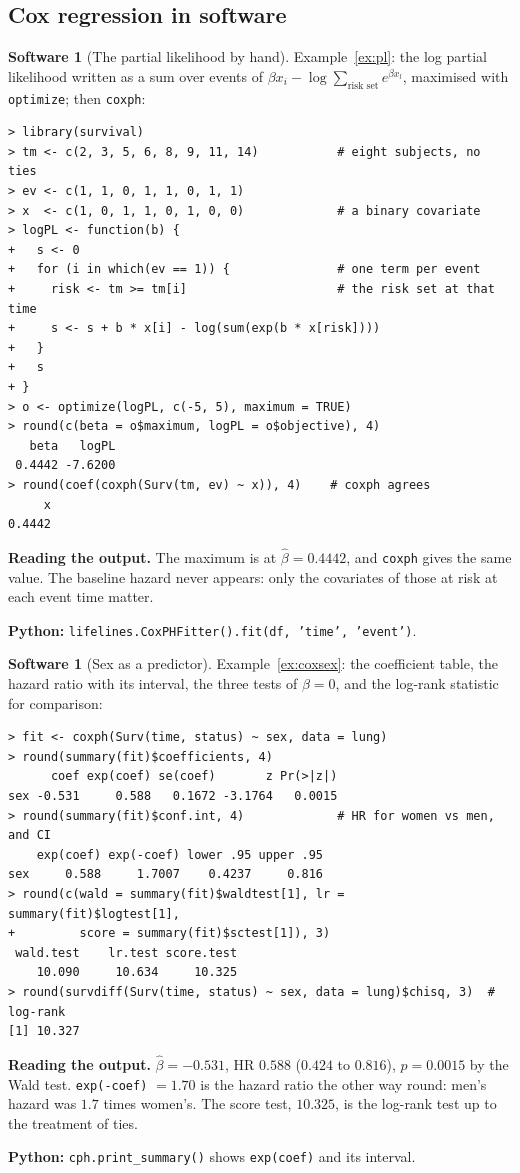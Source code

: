 \documentclass[11pt,a4paper]{article}
\numberwithin{equation}{section}
\theoremstyle{definition}
\newtheorem{software}[thm]{Software}
\begin{document}
\subsection{Cox regression in software}
\label{ssec:software7}

\begin{software}[The partial likelihood by hand]
\label{sw:plhand}
Example~\ref{ex:pl}: the log partial likelihood written as a sum over events of $\beta x_i - \log\sum_{\text{risk set}}e^{\beta x_l}$, maximised with \texttt{optimize}; then \texttt{coxph}:
{\small\begin{verbatim}
> library(survival)
> tm <- c(2, 3, 5, 6, 8, 9, 11, 14)           # eight subjects, no ties
> ev <- c(1, 1, 0, 1, 1, 0, 1, 1)
> x  <- c(1, 0, 1, 1, 0, 1, 0, 0)             # a binary covariate
> logPL <- function(b) {
+   s <- 0
+   for (i in which(ev == 1)) {               # one term per event
+     risk <- tm >= tm[i]                     # the risk set at that time
+     s <- s + b * x[i] - log(sum(exp(b * x[risk])))
+   }
+   s
+ }
> o <- optimize(logPL, c(-5, 5), maximum = TRUE)
> round(c(beta = o$maximum, logPL = o$objective), 4)
   beta   logPL 
 0.4442 -7.6200 
> round(coef(coxph(Surv(tm, ev) ~ x)), 4)    # coxph agrees
     x 
0.4442 
\end{verbatim}}
\textbf{Reading the output.} The maximum is at $\hat\beta = 0.4442$, and \texttt{coxph} gives the same value. The baseline hazard never appears: only the covariates of those at risk at each event time matter.

\textbf{Python:} \texttt{lifelines.CoxPHFitter().fit(df, 'time', 'event')}.
\end{software}

\begin{software}[Sex as a predictor]
\label{sw:coxsex}
Example~\ref{ex:coxsex}: the coefficient table, the hazard ratio with its interval, the three tests of $\beta = 0$, and the log-rank statistic for comparison:
{\small\begin{verbatim}
> fit <- coxph(Surv(time, status) ~ sex, data = lung)
> round(summary(fit)$coefficients, 4)
      coef exp(coef) se(coef)       z Pr(>|z|)
sex -0.531     0.588   0.1672 -3.1764   0.0015
> round(summary(fit)$conf.int, 4)             # HR for women vs men, and CI
    exp(coef) exp(-coef) lower .95 upper .95
sex     0.588     1.7007    0.4237     0.816
> round(c(wald = summary(fit)$waldtest[1], lr = summary(fit)$logtest[1],
+         score = summary(fit)$sctest[1]), 3)
 wald.test    lr.test score.test 
    10.090     10.634     10.325 
> round(survdiff(Surv(time, status) ~ sex, data = lung)$chisq, 3)  # log-rank
[1] 10.327
\end{verbatim}}
\textbf{Reading the output.} $\hat\beta = -0.531$, HR $0.588$ ($0.424$ to $0.816$), $p = 0.0015$ by the Wald test. \texttt{exp(-coef)} $= 1.70$ is the hazard ratio the other way round: men's hazard was $1.7$ times women's. The score test, $10.325$, is the log-rank test up to the treatment of ties.

\textbf{Python:} \texttt{cph.print\_summary()} shows \texttt{exp(coef)} and its interval.
\end{software}
\end{document}
